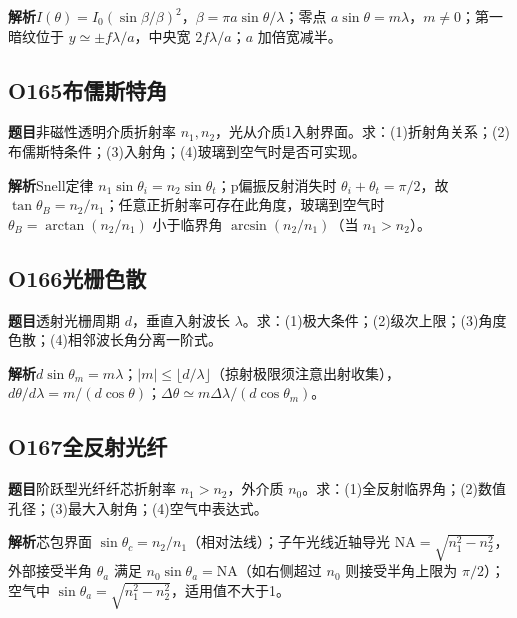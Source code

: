 \par\textbf{解析}\quad $I(\theta)=I_0(\sin\beta/\beta)^2$，$\beta=\pi a\sin\theta/\lambda$；零点 $a\sin\theta=m\lambda$，$m\ne0$；第一暗纹位于 $y\simeq\pm f\lambda/a$，中央宽 $2f\lambda/a$；$a$ 加倍宽减半。

\par\medskip

\subsection*{O165\quad 布儒斯特角}

\textbf{题目}\quad 非磁性透明介质折射率 $n_1,n_2$，光从介质1入射界面。求：(1)折射角关系；(2)布儒斯特条件；(3)入射角；(4)玻璃到空气时是否可实现。

\par\textbf{解析}\quad Snell定律 $n_1\sin\theta_i=n_2\sin\theta_t$；p偏振反射消失时 $\theta_i+\theta_t=\pi/2$，故 $\tan\theta_B=n_2/n_1$；任意正折射率可存在此角度，玻璃到空气时 $\theta_B=\arctan(n_2/n_1)$ 小于临界角 $\arcsin(n_2/n_1)$（当 $n_1>n_2$）。

\par\medskip

\subsection*{O166\quad 光栅色散}

\textbf{题目}\quad 透射光栅周期 $d$，垂直入射波长 $\lambda$。求：(1)极大条件；(2)级次上限；(3)角度色散；(4)相邻波长角分离一阶式。

\par\textbf{解析}\quad $d\sin\theta_m=m\lambda$；$|m|\le\lfloor d/\lambda\rfloor$（掠射极限须注意出射收集），$d\theta/d\lambda=m/(d\cos\theta)$；$\Delta\theta\simeq m\Delta\lambda/(d\cos\theta_m)$。

\par\medskip

\subsection*{O167\quad 全反射光纤}

\textbf{题目}\quad 阶跃型光纤纤芯折射率 $n_1>n_2$，外介质 $n_0$。求：(1)全反射临界角；(2)数值孔径；(3)最大入射角；(4)空气中表达式。

\par\textbf{解析}\quad 芯包界面 $\sin\theta_c=n_2/n_1$（相对法线）；子午光线近轴导光 $\mathrm{NA}=\sqrt{n_1^2-n_2^2}$，外部接受半角 $\theta_a$ 满足 $n_0\sin\theta_a=\mathrm{NA}$（如右侧超过 $n_0$ 则接受半角上限为 $\pi/2$）；空气中 $\sin\theta_a=\sqrt{n_1^2-n_2^2}$，适用值不大于1。

